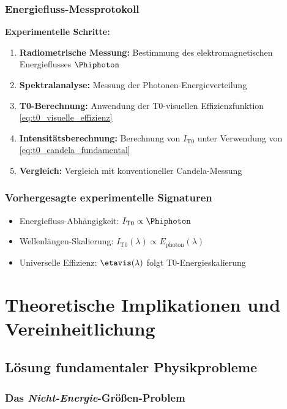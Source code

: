 	\subsubsection{Energiefluss-Messprotokoll}
	\label{subsubsec:candela_energie_protokoll}
	
	\textbf{Experimentelle Schritte:}
	\begin{enumerate}
		\item \textbf{Radiometrische Messung:} Bestimmung des elektromagnetischen Energieflusses $\Phiphoton$
		\item \textbf{Spektralanalyse:} Messung der Photonen-Energieverteilung
		\item \textbf{T0-Berechnung:} Anwendung der T0-visuellen Effizienzfunktion \cref{eq:t0_visuelle_effizienz}
		\item \textbf{Intensitätsberechnung:} Berechnung von $I_{\text{T0}}$ unter Verwendung von \cref{eq:t0_candela_fundamental}
		\item \textbf{Vergleich:} Vergleich mit konventioneller Candela-Messung
	\end{enumerate}
	
	\subsubsection{Vorhergesagte experimentelle Signaturen}
	\label{subsubsec:candela_experimentelle_signaturen}
	
	\begin{itemize}
		\item Energiefluss-Abhängigkeit: $I_{\text{T0}} \propto \Phiphoton$
		\item Wellenlängen-Skalierung: $I_{\text{T0}}(\lambda) \propto E_{\text{photon}}(\lambda)$
		\item Universelle Effizienz: $\etavis(\lambda)$ folgt T0-Energieskalierung
	\end{itemize}
	
	\section{Theoretische Implikationen und Vereinheitlichung}
	\label{sec:theoretische_implikationen}
	
	\subsection{Lösung fundamentaler Physikprobleme}
	\label{subsec:loesung_fundamentaler_probleme}
	
	\subsubsection{Das \textit{Nicht-Energie}-Größen-Problem}
	\label{subsubsec:nicht_energie_problem_geloest}
	
